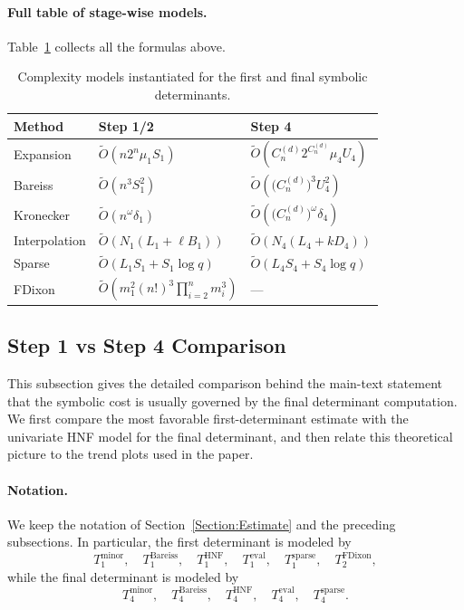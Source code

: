 \paragraph{Full table of stage-wise models.}
Table~\ref{tab:step14_models_full} collects all the formulas above.

\begin{table}[!htbp]
	\centering
	\small
	\caption{Complexity models instantiated for the first and final symbolic determinants.}
	\label{tab:step14_models_full}
	\setlength{\tabcolsep}{4pt}
	\renewcommand{\arraystretch}{1.05}
	\begin{tabular}{p{}p{}p{}}
		\toprule
		\textbf{Method} & \textbf{Step 1/2} & \textbf{Step 4} \\
		\midrule
		Expansion & $\widetilde{O}(n2^n\mu_1S_1)$ & $\widetilde{O}\!\left(C_n^{(d)}2^{C_n^{(d)}}\mu_4U_4\right)$ \\
		Bareiss & $\widetilde{O}(n^3S_1^2)$ & $\widetilde{O}\!\left(\bigl(C_n^{(d)}\bigr)^3U_4^2\right)$ \\
		Kronecker & $\widetilde{O}(n^\omega \delta_1)$ & $\widetilde{O}\!\left(\bigl(C_n^{(d)}\bigr)^\omega\delta_4\right)$ \\
		Interpolation & $\widetilde{O}(N_1(L_1+\ell B_1))$ & $\widetilde{O}(N_4(L_4+kD_4))$ \\
		Sparse & $\widetilde{O}(L_1S_1+S_1\log q)$ & $\widetilde{O}(L_4S_4+S_4\log q)$ \\
		FDixon & $\widetilde{O}(m_1^2(n!)^3\prod_{i=2}^{n}m_i^3)$ & --- \\
		\bottomrule
	\end{tabular}
\end{table}

\subsection{Step 1 vs Step 4 Comparison}\label{appendix:step_comparison}

This subsection gives the detailed comparison behind the main-text statement that the symbolic cost is usually governed by the final determinant computation. We first compare the most favorable first-determinant estimate with the univariate HNF model for the final determinant, and then relate this theoretical picture to the trend plots used in the paper.

\paragraph{Notation.}
We keep the notation of Section~\ref{Section:Estimate} and the preceding subsections. In particular, the first determinant is modeled by
\[
T_{1}^{\mathrm{minor}},\quad
T_{1}^{\mathrm{Bareiss}},\quad
T_{1}^{\mathrm{HNF}},\quad
T_{1}^{\mathrm{eval}},\quad
T_{1}^{\mathrm{sparse}},\quad
T_{2}^{\mathrm{FDixon}},
\]
while the final determinant is modeled by
\[
T_{4}^{\mathrm{minor}},\quad
T_{4}^{\mathrm{Bareiss}},\quad
T_{4}^{\mathrm{HNF}},\quad
T_{4}^{\mathrm{eval}},\quad
T_{4}^{\mathrm{sparse}}.
\]

